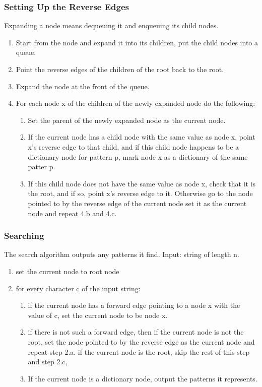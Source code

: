 \documentclass[paper=a4, fontsize=11pt]{scrartcl} %
\numberwithin{equation}{section} %
\numberwithin{figure}{section} %
\numberwithin{table}{section} %
\begin{document}
\subsubsection{Setting Up the Reverse Edges}
Expanding a node means dequeuing it and enqueuing its child nodes.
\begin{enumerate}
\item Start from the node and expand it into its children, put the child nodes into a queue.

\item Point the reverse edges of the children of the root back to the root.

\item Expand the node at the front of the queue.

\item For each node x of the children of the newly expanded node do the following:

\begin{enumerate}
    \item Set the parent of the newly expanded node as the current node.

    \item If the current node has a child node with the same value as node x, point x's reverse edge to that child, and if this child node happens to be a dictionary node for pattern p, mark node x as a dictionary of the same patter p. 
    \item If this child node does not have the same value as node x, check that it is the root, and if so, point x's reverse edge to it. Otherwise go to the node pointed to by the reverse edge of the current node set it as the current node and repeat 4.b and 4.c.
\end{enumerate}
\end{enumerate}

\subsubsection{Searching}
The search algorithm outputs any patterns it find. Input: string of length n.\\

\begin{enumerate}
\item set the current node to root node
\item for every character c of the input string:
\begin{enumerate}
\item if the current node has a forward edge pointing to a node x with the value of c, set the current node to be node x. 
\item if there is not such a forward edge, then if the current node is not the root, set the node pointed to by the reverse edge as the current node and repeat step 2.a. if the current node is the root, skip the rest of this step and step 2.c,   
\item If the current node is a dictionary node, output the patterns it represents.
\end{enumerate}
\end{enumerate}
\end{document}
